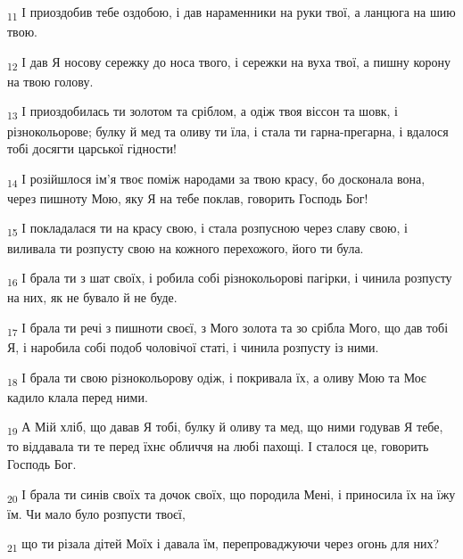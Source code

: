 \begin{tcolorbox}
\textsubscript{11} І приоздобив тебе оздобою, і дав нараменники на руки твої, а ланцюга на шию твою.
\end{tcolorbox}
\begin{tcolorbox}
\textsubscript{12} І дав Я носову сережку до носа твого, і сережки на вуха твої, а пишну корону на твою голову.
\end{tcolorbox}
\begin{tcolorbox}
\textsubscript{13} І приоздобилась ти золотом та сріблом, а одіж твоя віссон та шовк, і різнокольорове; булку й мед та оливу ти їла, і стала ти гарна-прегарна, і вдалося тобі досягти царської гідности!
\end{tcolorbox}
\begin{tcolorbox}
\textsubscript{14} І розійшлося ім'я твоє поміж народами за твою красу, бо досконала вона, через пишноту Мою, яку Я на тебе поклав, говорить Господь Бог!
\end{tcolorbox}
\begin{tcolorbox}
\textsubscript{15} І покладалася ти на красу свою, і стала розпусною через славу свою, і виливала ти розпусту свою на кожного перехожого, його ти була.
\end{tcolorbox}
\begin{tcolorbox}
\textsubscript{16} І брала ти з шат своїх, і робила собі різнокольорові пагірки, і чинила розпусту на них, як не бувало й не буде.
\end{tcolorbox}
\begin{tcolorbox}
\textsubscript{17} І брала ти речі з пишноти своєї, з Мого золота та зо срібла Мого, що дав тобі Я, і наробила собі подоб чоловічої статі, і чинила розпусту із ними.
\end{tcolorbox}
\begin{tcolorbox}
\textsubscript{18} І брала ти свою різнокольорову одіж, і покривала їх, а оливу Мою та Моє кадило клала перед ними.
\end{tcolorbox}
\begin{tcolorbox}
\textsubscript{19} А Мій хліб, що давав Я тобі, булку й оливу та мед, що ними годував Я тебе, то віддавала ти те перед їхнє обличчя на любі пахощі. І сталося це, говорить Господь Бог.
\end{tcolorbox}
\begin{tcolorbox}
\textsubscript{20} І брала ти синів своїх та дочок своїх, що породила Мені, і приносила їх на їжу їм. Чи мало було розпусти твоєї,
\end{tcolorbox}
\begin{tcolorbox}
\textsubscript{21} що ти різала дітей Моїх і давала їм, перепроваджуючи через огонь для них?
\end{tcolorbox}
